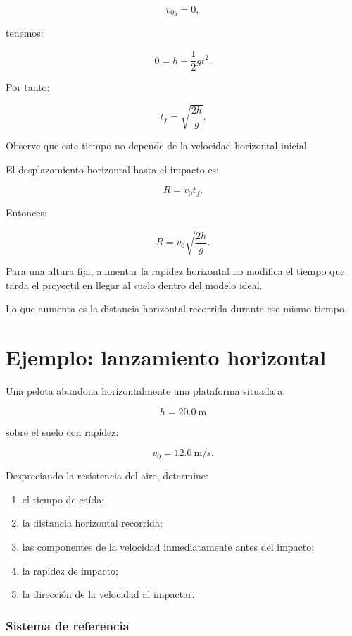 \[
v_{0y}=0,
\]

tenemos:

\[
0
=
h-\frac{1}{2}gt^2.
\]

Por tanto:

\[
\boxed{
t_f
=
\sqrt{\frac{2h}{g}}
}.
\]

Observe que este tiempo no depende de la velocidad horizontal inicial.

El desplazamiento horizontal hasta el impacto es:

\[
R=v_0t_f.
\]

Entonces:

\[
\boxed{
R
=
v_0
\sqrt{\frac{2h}{g}}
}.
\]

\begin{interpretacion}
Para una altura fija, aumentar la rapidez horizontal no modifica el tiempo que
tarda el proyectil en llegar al suelo dentro del modelo ideal.

Lo que aumenta es la distancia horizontal recorrida durante ese mismo tiempo.
\end{interpretacion}


\section{Ejemplo: lanzamiento horizontal}

\begin{ejemplo}
Una pelota abandona horizontalmente una plataforma situada a:

\[
h=\SI{20.0}{\meter}
\]

sobre el suelo con rapidez:

\[
v_0=\SI{12.0}{\meter\per\second}.
\]

Despreciando la resistencia del aire, determine:

\begin{enumerate}[label=\alph*)]
    \item el tiempo de caída;
    \item la distancia horizontal recorrida;
    \item las componentes de la velocidad inmediatamente antes del impacto;
    \item la rapidez de impacto;
    \item la dirección de la velocidad al impactar.
\end{enumerate}
\end{ejemplo}

\subsubsection*{Sistema de referencia}

